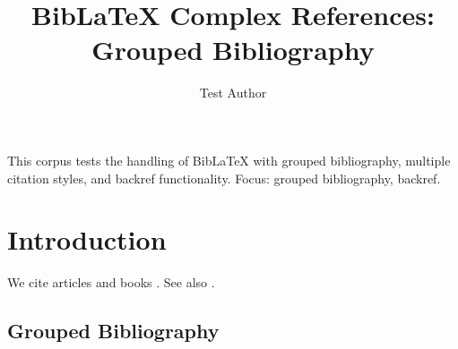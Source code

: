 \documentclass{article}
\title{BibLaTeX Complex References: Grouped Bibliography}
\author{Test Author}
\begin{document}
\maketitle

\begin{abstrct}
This corpus tests the handling of BibLaTeX with grouped bibliography, multiple
citation styles, and backref functionality.
Focus: grouped bibliography, backref.
\end{abstrct}

\section{Introduction}

We cite articles \parencite{einstein1905} and books \textcite{knuth1984}.
See also \supercite{Dirac1953}.

\subsection{Grouped Bibliography}

\begin{refsection}
\nocite{physics1,physics2,physics3}
\printbibliography[title={Physics References}]
\end{refsection}

\begin{refsection}
\nocite{cs1,cs2,cs3}
\printbibliography[title={Computer Science References}]
\end{refsection}

\printbibliography[title={General References}]


\end{document}
